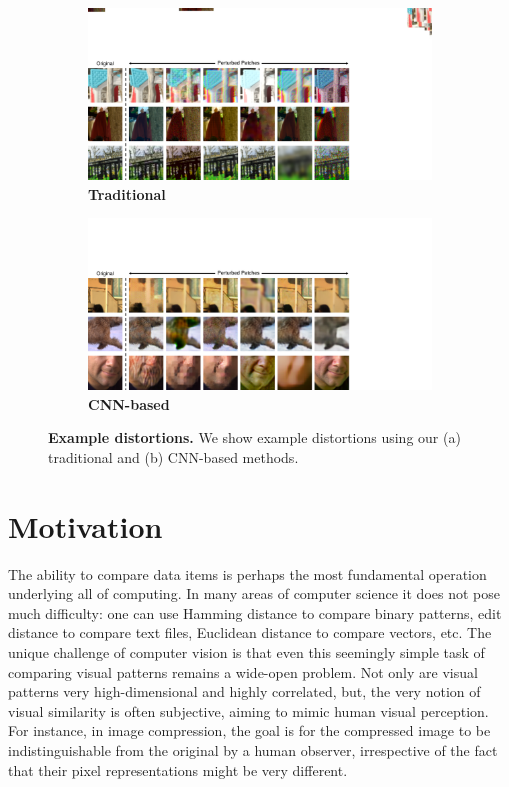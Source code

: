 
\begin{figure}
\centering
\begin{subfigure}{.485\textwidth}
  \centering
  \includegraphics[width=1.\linewidth]{imgs/pert_lowlevel.pdf}
  \caption{\textbf{Traditional}}
  \label{fig:pert_low}
\end{subfigure}
\hspace{8px}
\begin{subfigure}{.485\textwidth}
  \centering
  \includegraphics[width=1.\linewidth]{imgs/pert_highlevel.pdf}
  \caption{\textbf{CNN-based}}
  \label{fig:pert_high}
\end{subfigure}
\vspace{-2mm}
\caption{\textbf{Example distortions.} We show example distortions using our (a) traditional and (b) CNN-based methods.}
\vspace{-4mm}
\label{fig:pert}
\end{figure}

\section{Motivation}

The ability to compare data items is perhaps the most fundamental operation underlying all of computing.  In many areas of computer science it does not pose much difficulty: one can use Hamming distance to compare binary patterns, edit distance to compare text files, Euclidean distance to compare vectors, etc.  The unique challenge of computer vision is that even this seemingly simple task of comparing visual patterns remains a wide-open problem.  Not only are visual patterns very high-dimensional and highly correlated, but, the very notion of visual similarity is often subjective, aiming to mimic human visual perception.  For instance, in image compression, the goal is for the compressed image to be indistinguishable from the original by a human observer, irrespective of the fact that their pixel representations might be very different. 

